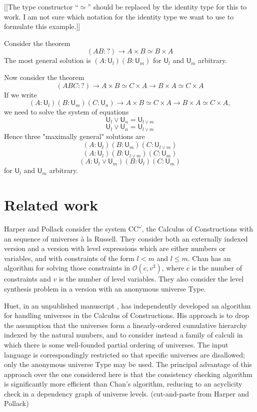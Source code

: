 \documentclass[11pt,a4paper]{article}
\def\UU{\mathsf{U}}
\def\Ordo{\mathcal{O}}
\def\CComega{\mathrm{CC}^\omega}
\begin{document}
[[The type constructor ``$\simeq$'' should be replaced by the identity type for this to work. I am not sure which notation for the identity type we want to use to formulate this example.]]

Consider the theorem
$$
    (A B : ?) \to A \times B \simeq B \times A
$$
The most general solution is $(A : \UU_l) (B : \UU_m)$ for $\UU_l$ and $\UU_m$ arbitrary.

Now  consider the theorem
$$
    (A B C : ?) \to A \times B \simeq C \times A \to B \times A \simeq C \times A
$$
If we write
$$
    (A : \UU_l) (B : \UU_m) (C : \UU_n) \to A \times B \simeq C \times A \to B \times A \simeq C \times A,
$$
we need to solve the system of equations
$$
    \UU_l \vee \UU_n = \UU_{l \vee m}
$$
$$
    \UU_l \vee \UU_n = \UU_{l \vee m}
$$
Hence three "maximally general" solutions are
$$
    (A : \UU_l ) (B : \UU_m ) (C : \UU_{l \vee m} )
$$
$$
    (A : \UU_l ) (B : \UU_{l \vee m }) (C : \UU_m )
$$
$$
    (A : \UU_l \vee \UU_m ) (B : \UU_l) (C : \UU_m )
$$
for $\UU_l$ and $\UU_m$ arbitrary.

\section{Related work}

Harper and Pollack \cite{HarperP91} consider the system $\CComega$, the Calculus of Constructions with an sequence of universes \`a la Russell. They consider both an externally indexed version and a version with level expressions which are either numbers or variables, and with constraints of the form $l < m$ and $l \leq m$. Chan has an algorithm for solving those constraints in $\Ordo(c,v^3)$, where $c$ is the number of constraints and $v$ is the number of level variables. They also consider the level synthesis problem in a version with an anonymous universe Type.

Huet, in an unpublished manuscript \cite{Huet87}, has independently developed an
algorithm for handling universes in the Calculus of Constructions. His approach is to drop the assumption that the universes form a linearly-ordered
cumulative hierarchy indexed by the natural numbers, and to consider instead a family of calculi in which there is some well-founded partial ordering
of universes. The input language is correspondingly restricted so that specific universes are disallowed; only the anonymous universe Type may be
used. The principal advantage of this approach over the one considered here
is that the consistency checking algorithm is significantly more efficient than
Chan's algorithm, reducing to an acyclicity check in a dependency graph of
universe levels. (cut-and-paste from Harper and Pollack)
\end{document}
